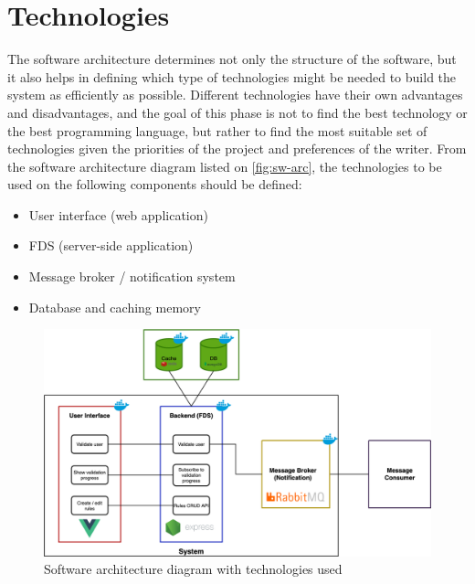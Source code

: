 \section{Technologies}

The software architecture determines not only the structure of the software, but it also helps in defining which type of technologies might be needed to build the system as efficiently as possible. Different technologies have their own advantages and disadvantages, and the goal of this phase is not to find the best technology or the best programming language, but rather to find the most suitable set of technologies given the priorities of the project and preferences of the writer.
From the software architecture diagram listed on \autoref{fig:sw-arc}, the technologies to be used on the following components should be defined:
\begin{itemize}
 \item User interface (web application)
 \item FDS (server-side application)
 \item Message broker / notification system 
 \item Database and caching memory
\end{itemize}

\begin{figure}[h]
 \includegraphics[width=\textwidth]{diagrams/tech-arc.png}
 \caption{Software architecture diagram with technologies used}
 \label{fig:sw-arc-tech}
\end{figure}

